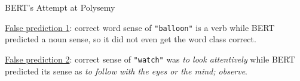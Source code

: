 \begin{frame}{BERT's Attempt at Polysemy}
\begin{itemizeSpaced}{7pt}
\begin{itemizeSpaced}{7pt}
            \item \underline{False prediction 1}: correct word sense of \texttt{"balloon"} is a verb while BERT predicted a noun sense, so it did not even get the word class correct.
            
            \item \underline{False prediction 2}: correct sense of \texttt{"watch"} was \emph{to look attentively} while BERT predicted its sense as \emph{to follow with the eyes or the mind; observe}. 
        \end{itemizeSpaced}
        
    \end{itemizeSpaced}
    
\end{frame}